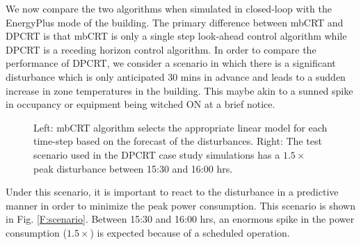 We now compare the two algorithms when simulated in closed-loop with the EnergyPlus mode of the building. 
The primary difference between mbCRT and DPCRT is that mbCRT is only a single step look-ahead control algorithm while DPCRT is a receding horizon control algorithm. 
In order to compare the performance of DPCRT, we consider a scenario in which there is a significant disturbance which is only anticipated 30 mins in advance and leads to a sudden increase in zone temperatures in the building. This maybe akin to a sunned spike in occupancy or equipment being witched ON at a brief notice.
\begin{figure}
\centering
{} \hspace{1pt}
\caption{Left: mbCRT algorithm selects the appropriate linear model for each time-step based on the forecast of the disturbances. Right: The test scenario used in the DPCRT case study simulations has a $1.5\times$ peak disturbance between 15:30 and 16:00 hrs. }
\vspace{-10pt}
\end{figure}
Under this scenario, it is important to react to the disturbance in a predictive manner in order to minimize the peak power consumption. 
This scenario is shown in Fig. \ref{F:scenario}. Between 15:30 and 16:00 hrs, an enormous spike in the power consumption ($1.5\times$) is expected because of a scheduled operation.

